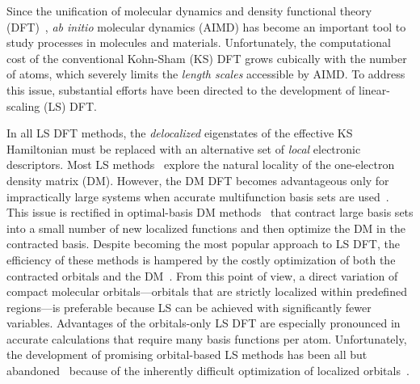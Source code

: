 \documentclass[aip,jcp,reprint,amsmath,amssymb]{revtex4-1}
\begin{document}
\maketitle


Since the unification of molecular dynamics and density functional theory (DFT)~\cite{a:thecpmd},
\emph{ab initio} molecular dynamics (AIMD) has become an important tool to study processes in molecules and materials.
Unfortunately, the computational cost of the conventional Kohn-Sham (KS) DFT grows cubically with the number of atoms, which severely limits the \emph{length scales} accessible by AIMD. %
To address this issue, substantial efforts have been directed to the development of linear-scaling (LS) DFT.

In all LS DFT methods, the \emph{delocalized} eigenstates of the effective KS Hamiltonian must be replaced with an alternative set of \emph{local} electronic descriptors. 
Most LS methods~\cite{a:ls-rev-1999, a:ls-rev-2012, Kussmann2013, Aarons2016} explore the natural locality of the one-electron density matrix (DM). 
However, the DM DFT becomes advantageous only for impractically large systems when accurate multifunction basis sets are used~\cite{a:ls-dm-sign, Arita2014, a:ls-rev-2012, a:almo-ls}.
This issue is rectified in optimal-basis DM methods~\cite{Skylaris2005, Nakata2015, Mohr2015} that contract large basis sets into a small number of new localized functions and then optimize the DM in the contracted basis. 
Despite becoming the most popular approach to LS DFT, the efficiency of these methods is hampered by the costly optimization of both the contracted orbitals and the DM~\cite{a:ls-onetep-2003}. 
From this point of view, a direct variation of compact molecular orbitals---orbitals that are strictly localized within predefined regions---is preferable because LS can be achieved with significantly fewer variables. 
Advantages of the orbitals-only LS DFT are especially pronounced in accurate calculations that require many basis functions per atom.
Unfortunately, the development of promising orbital-based LS methods has been all but abandoned~\cite{a:weitao-yang-2013,a:ls-tsuchida-aomm} because of the inherently difficult optimization of localized orbitals~\cite{a:ls-rev-1999,a:ls-mauri-galli-car-1993,a:ls-ordejon-1995,a:ls-fattebert-2004,a:weitao-yang-2013,a:ls-tsuchida-aomm}. 
\end{document}

